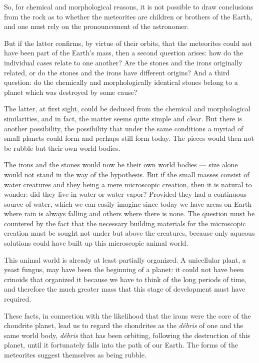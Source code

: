 \documentclass[a4paper, 12pt, oneside]{article}
\begin{document}
So, for chemical and morphological reasons, it is not possible to draw conclusions from the rock as to whether the meteorites are children or brothers of the Earth, and one must rely on the pronouncement of the astronomer.

But if the latter confirms, by virtue of their orbits, that the meteorites could not have been part of the Earth's mass, then a second question arises: how do the individual cases relate to one another? Are the stones and the irons originally related, or do the stones and the irons have different origins? And a third question: do the chemically and morphologically identical stones belong to a planet which was destroyed by some cause?

The latter, at first sight, could be deduced from the chemical and morphological similarities, and in fact, the matter seems quite simple and clear. But there is another possibility, the possibility that under the same conditions a myriad of small planets could form and perhaps still form today. The pieces would then not be rubble but their own world bodies.

The irons and the stones would now be their own world bodies --- size alone would not stand in the way of the hypothesis. But if the small masses consist of water creatures and they being a mere microscopic creation, then it is natural to wonder: did they live in water or water vapor? Provided they had a continuous source of water, which we can easily imagine since today we have areas on Earth where rain is always falling and others where there is none. The question must be countered by the fact that the necessary building materials for the microscopic creation must be sought not under but above the creatures, because only aqueous solutions could have built up this microscopic animal world.

This animal world is already at least partially organized. A unicellular plant, a yeast fungus, may have been the beginning of a planet: it could not have been crinoids that organized it because we have to think of the long periods of time, and therefore the much greater mass that this stage of development must have required.

These facts, in connection with the likelihood that the irons were the core of the chondrite planet, lead us to regard the chondrites as the \emph{débris} of one and the same world body, \emph{débris} that has been orbiting, following the destruction of this planet, until it fortunately falls into the path of our Earth. The forms of the meteorites suggest themselves as being rubble.
\end{document}
